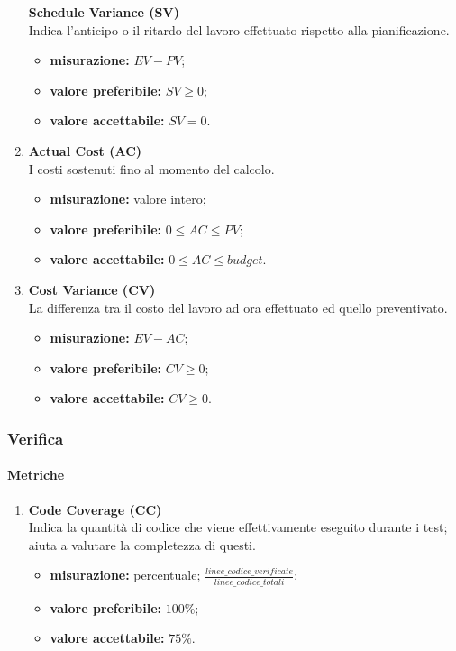 \begin{enumerate}
	      \textbf{Schedule Variance (SV)}\\
	      Indica l'anticipo o il ritardo del lavoro effettuato rispetto alla pianificazione.
	      \begin{itemize}
		      \item \textbf{misurazione:} $EV-PV$;
		      \item \textbf{valore preferibile:} $SV\geq 0$;
		      \item \textbf{valore accettabile:} $SV=0$.
	      \end{itemize}
	\item[]
	      \textbf{Actual Cost (AC)}\\
	      I costi sostenuti fino al momento del calcolo.
	      \begin{itemize}
		      \item \textbf{misurazione:} valore intero;
		      \item \textbf{valore preferibile:} $0\leq AC\leq PV$;
		      \item \textbf{valore accettabile:} $0\leq AC\leq budget$.
	      \end{itemize}
	\item[]
	      \textbf{Cost Variance (CV)}\\
	      La differenza tra il costo del lavoro ad ora effettuato ed quello preventivato.
	      \begin{itemize}
		      \item \textbf{misurazione:} $EV-AC$;
		      \item \textbf{valore preferibile:} $CV\geq 0$;
		      \item \textbf{valore accettabile:} $CV\geq 0$.
	      \end{itemize}
\end{enumerate}
\subsubsection{Verifica}
\paragraph{Metriche}
\begin{enumerate}
	\item[]
	      \textbf{Code Coverage (CC)}\\
	      Indica la quantità di codice che viene effettivamente eseguito durante i test; aiuta a valutare la completezza di questi.
	      \begin{itemize}
		      \item \textbf{misurazione:} percentuale; $\frac{linee\_codice\_verificate}{linee\_codice\_totali}$;
		      \item \textbf{valore preferibile:} $100\%$;
		      \item \textbf{valore accettabile:} $75\%$.
	      \end{itemize}
\end{enumerate}
